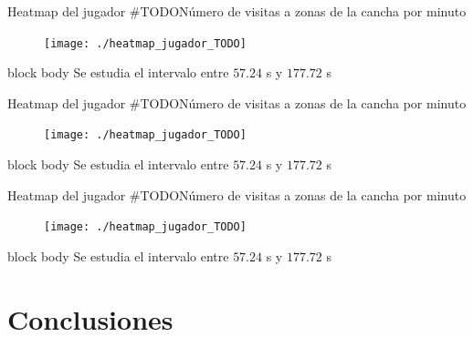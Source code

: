 \documentclass{beamer}
\begin{document}
            \begin{frame}{Heatmap del jugador \#TODO}{Número de visitas a zonas de la cancha por minuto}
                \begin{figure}[H!]
                    \texttt{[image: ./heatmap\_jugador\_TODO]}
                    \label{fig:futbol_13}
                \end{figure}
                \begin{beamercolorbox}[sep=5pt,center]{block body}
                    \centering
                    \small{Se estudia el intervalo entre $57.24$ s y $177.72$ s}
                \end{beamercolorbox}
            \end{frame}

            \begin{frame}{Heatmap del jugador \#TODO}{Número de visitas a zonas de la cancha por minuto}
                \begin{figure}[H!]
                    \texttt{[image: ./heatmap\_jugador\_TODO]}
                    \label{fig:futbol_14}
                \end{figure}
                \begin{beamercolorbox}[sep=5pt,center]{block body}
                    \centering
                    \small{Se estudia el intervalo entre $57.24$ s y $177.72$ s}
                \end{beamercolorbox}
            \end{frame}

            \begin{frame}{Heatmap del jugador \#TODO}{Número de visitas a zonas de la cancha por minuto}
                \begin{figure}[H!]
                    \texttt{[image: ./heatmap\_jugador\_TODO]}
                    \label{fig:futbol_15}
                \end{figure}
                \begin{beamercolorbox}[sep=5pt,center]{block body}
                    \centering
                    \small{Se estudia el intervalo entre $57.24$ s y $177.72$ s}
                \end{beamercolorbox}
            \end{frame}

    \section{Conclusiones}
\end{document}
